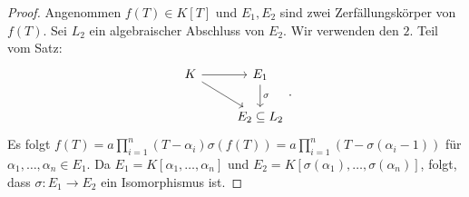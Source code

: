 \begin{proof}
	Angenommen $f(T) \in K[T]$ und $E_1,E_2$ sind zwei Zerfällungskörper von $f(T)$.
	Sei $L_2$ ein algebraischer Abschluss von $E_2$. Wir verwenden den $2.$ Teil vom Satz:
	\[
		\begin{tikzcd}
			K \arrow[r] \arrow[rd] & E_1 \arrow[d, "\sigma"] \\
                       & E_2 \subseteq L_2      
		\end{tikzcd}
	.\] 
	Es folgt $f(T) = a \prod_{i=1}^{n} (T-\alpha_{i}) \sigma(f(T)) = a \prod_{i=1}^{n} (T - \sigma(\alpha_{i} -1))$ für $\alpha_1,\ldots,\alpha_{n} \in E_1$.
	Da $E_1 = K[\alpha_1,\ldots,\alpha_{n}]$ und $E_2 = K[\sigma(\alpha_1),\ldots, \sigma(\alpha_{n})]$, folgt, dass $\sigma: E_1 \to E_2$ ein
	Isomorphismus ist.
\end{proof}
















































